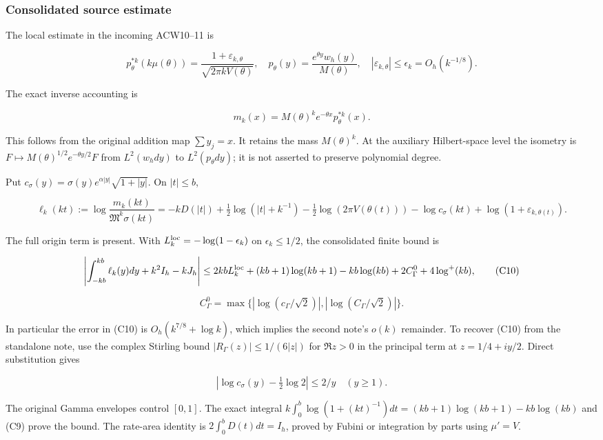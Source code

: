 \subsubsection{Consolidated source estimate}\label{loc:consolidated-source-estimate}

The local estimate in the incoming ACW10--11 is

\[
p_\theta^{*k}(k\mu(\theta))
=\frac{1+\varepsilon_{k,\theta}}{\sqrt{2\pi kV(\theta)}},
\quad p_\theta(y)=\frac{e^{\theta y}w_h(y)}{M(\theta)},
\quad |\varepsilon_{k,\theta}|\le\epsilon_k=O_h(k^{-1/8}).
\tag{C7}
\]

The exact inverse accounting is

\[
m_k(x)=M(\theta)^k e^{-\theta x}p_\theta^{*k}(x).
\tag{C8}
\]

This follows from the original addition map \(\sum y_j=x\). It retains the mass \(M(\theta)^k\). At the auxiliary Hilbert-space level the isometry is
\(F\mapsto M(\theta)^{1/2}e^{-\theta y/2}F\) from \(L^2(w_hdy)\) to \(L^2(p_\theta dy)\); it is not asserted to preserve polynomial degree.

Put \(c_\sigma(y)=\sigma(y)e^{\alpha|y|}\sqrt{1+|y|}\). On \(|t|\le b\),

\[
\ell_k(kt):=\log\frac{m_k(kt)}{\mathfrak M^k\sigma(kt)}
=-kD(|t|)+\tfrac12\log(|t|+k^{-1})
-\tfrac12\log(2\pi V(\theta(t)))-\log c_\sigma(kt)
+\log(1+\varepsilon_{k,\theta(t)}).
\tag{C9}
\]

The full origin term is present. With \(L_k^{\rm loc}=-\log(1-\epsilon_k)\) on \(\epsilon_k\le1/2\), the consolidated finite bound is

\[
\left|\int_{-kb}^{kb}\ell_k(y)dy+k^2I_h-kJ_h\right|
\le 2kbL_k^{\rm loc}+(kb+1)\log(kb+1)-kb\log(kb)
+2C_\Gamma^0+4\log^+(kb),
\tag{C10}
\]

\[
C_\Gamma^0=\max\{|\log(c_\Gamma/\sqrt2)|,
|\log(C_\Gamma/\sqrt2)|\}.
\]

In particular the error in (C10) is \(O_h(k^{7/8}+\log k)\), which implies the second note's \(o(k)\) remainder. To recover (C10) from the standalone note, use the complex Stirling bound
\(|R_\Gamma(z)|\le1/(6|z|)\) for \(\Re z>0\) in the principal term at \(z=1/4+iy/2\). Direct substitution gives

\[
|\log c_\sigma(y)-\tfrac12\log2|\le2/y\quad(y\ge1).
\]

The original Gamma envelopes control \([0,1]\). The exact integral
\(k\int_0^b\log(1+(kt)^{-1})dt
=(kb+1)\log(kb+1)-kb\log(kb)\)
and (C9) prove the bound. The rate-area identity is
\(2\int_0^bD(t)dt=I_h\), proved by Fubini or integration by parts using \(\mu'=V\).

